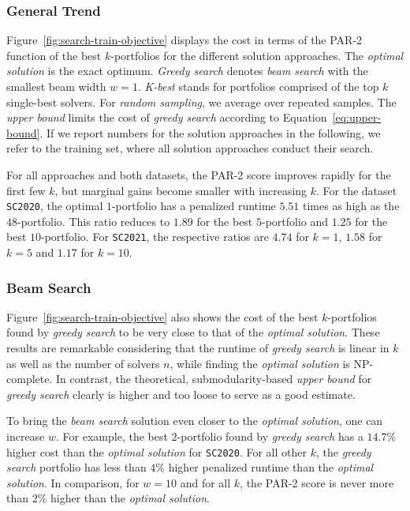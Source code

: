 \documentclass[conference]{IEEEtran}
\begin{document}
\subsubsection{General Trend}

Figure~\ref{fig:search-train-objective} displays the cost in terms of the PAR-2 function of the best $k$-portfolios for the different solution approaches. 
The \emph{optimal solution} is the exact optimum.
\emph{Greedy search} denotes \emph{beam search} with the smallest beam width $w=1$. 
\emph{K-best} stands for portfolios comprised of the top $k$ single-best solvers. 
For \emph{random sampling}, we average over repeated samples.
The \emph{upper bound} limits the cost of \emph{greedy search} according to Equation~\ref{eq:upper-bound}.
If we report numbers for the solution approaches in the following, we refer to the training set, where all solution approaches conduct their search.

For all approaches and both datasets, the PAR-2 score improves rapidly for the first few $k$, but marginal gains become smaller with increasing $k$.
For the dataset \texttt{SC2020}, the optimal $1$-portfolio has a penalized runtime $5.51$ times as high as the $48$-portfolio.
This ratio reduces to $1.89$ for the best $5$-portfolio and $1.25$ for the best $10$-portfolio.
For \texttt{SC2021}, the respective ratios are $4.74$ for $k=1$, $1.58$ for $k=5$ and $1.17$ for $k=10$.

\subsubsection{Beam Search}

Figure~\ref{fig:search-train-objective} also shows the cost of the best $k$-portfolios found by \emph{greedy search} to be very close to that of the \emph{optimal solution}.
These results are remarkable considering that the runtime of \emph{greedy search} is linear in $k$ as well as the number of solvers $n$, while finding the \emph{optimal solution} is NP-complete.
In contrast, the theoretical, submodularity-based \emph{upper bound} for \emph{greedy search} clearly is higher and too loose to serve as a good estimate.

To bring the \emph{beam search} solution even closer to the \emph{optimal solution}, one can increase $w$.
For example, the best $2$-portfolio found by \emph{greedy search} has a $14.7\%$ higher cost than the \emph{optimal solution} for \texttt{SC2020}.
For all other $k$, the \emph{greedy search} portfolio has less than $4\%$ higher penalized runtime than the \emph{optimal solution}.
In comparison, for $w=10$ and for all $k$, the PAR-2 score is never more than $2\%$ higher than the \emph{optimal solution}.
\end{document}
